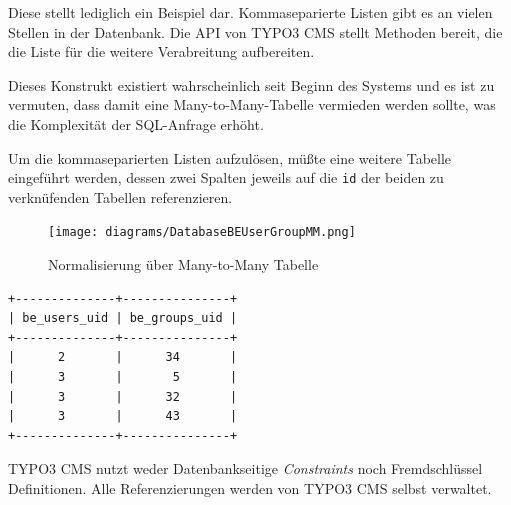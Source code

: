 Diese stellt lediglich ein Beispiel dar. Kommaseparierte Listen gibt es an vielen Stellen in der Datenbank. Die API von TYPO3 CMS stellt Methoden bereit, die die Liste für die weitere Verabreitung aufbereiten.

Dieses Konstrukt existiert wahrscheinlich seit Beginn des Systems und es ist zu vermuten, dass damit eine Many-to-Many-Tabelle vermieden werden sollte, was die Komplexität der SQL-Anfrage erhöht.

Um die kommaseparierten Listen aufzulösen, müßte eine weitere Tabelle eingeführt werden, dessen zwei Spalten jeweils auf die \texttt{id} der beiden zu verknüfenden Tabellen referenzieren.

\begin{figure}[H]
	\centering
	\texttt{[image: diagrams/DatabaseBEUserGroupMM.png]}
	\caption{Normalisierung über Many-to-Many Tabelle}
	\label{fig:beUsersHasBeGroups}
\end{figure}

\begin{Verbatim}[samepage=true]
+--------------+---------------+
| be_users_uid | be_groups_uid |
+--------------+---------------+
|      2       |      34       |
|      3       |       5       |
|      3       |      32       |
|      3       |      43       |
+--------------+---------------+
\end{Verbatim}

TYPO3 CMS nutzt weder Datenbankseitige \textit{Constraints} noch Fremdschlüssel Definitionen. Alle Referenzierungen werden von TYPO3 CMS selbst verwaltet.
